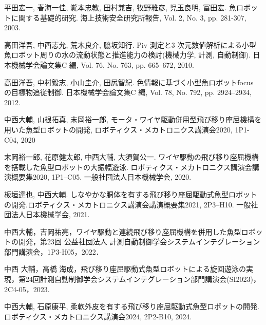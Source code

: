 
\newpage
\begin{thebibliography}{9}
    平田宏一, 春海一佳, 瀧本忠教, 田村兼吉, 牧野雅彦, 児玉良明, 冨田宏. 魚ロボットに関する基礎的研究. 海上技術安全研究所報告, Vol. 2, No. 3, pp. 281-307, 2003.
 
    高田洋吾, 中西志允, 荒木良介, 脇坂知行. Piv 測定と3 次元数値解析による小型魚ロボット周りの水の流動状態と推進能力の検討(機械力学, 計測, 自動制御). 日本機械学会論文集C 編, Vol. 76, No. 763, pp. 665–672, 2010.

    高田洋吾, 中村毅志, 小山圭介, 田尻智紀. 色情報に基づく小型魚ロボットfocus の目標物追従制御. 日本機械学会論文集C 編, Vol. 78, No. 792, pp. 2924–2934, 2012.

    中西大輔, 山根拓真, 末岡裕一郎, モータ・ワイヤ駆動併用型飛び移り座屈機構を用いた魚型ロボットの開発, ロボティクス・メカトロニクス講演会2020, 1P1-C04, 2020

    末岡裕一郎, 花原健太郎, 中西大輔, 大須賀公一. ワイヤ駆動の飛び移り座屈機構を搭載した魚型ロボットの大振幅遊泳. ロボティクス・メカトロニクス講演会講演概要集2020, 1P1–C05. 一般社団法人日本機械学会, 2020.

    板垣達也, 中西大輔. しなやかな胴体を有する飛び移り座屈駆動式魚型ロボットの開発.ロボティクス・メカトロニクス講演会講演概要集2021, 2P3–H10. 一般社団法人日本機械学会, 2021.

    中西大輔，吉岡祐亮，ワイヤ駆動と連続飛び移り座屈機構を併用した魚型ロボットの開発，第23回 公益社団法人 計測自動制御学会システムインテグレーション部門講演会，1P3-H05，2022．

    中西 大輔，高橋 海成，飛び移り座屈駆動式魚型ロボットによる旋回遊泳の実現，第24回計測自動制御学会システムインテグレーション部門講演会(SI2023)，2C4-05，2023.

    中西大輔, 石原康平, 柔軟外皮を有する飛び移り座屈駆動式魚型ロボットの開発. ロボティクス・メカトロニクス講演会2024, 2P2-B10, 2024.
\end{thebibliography}


